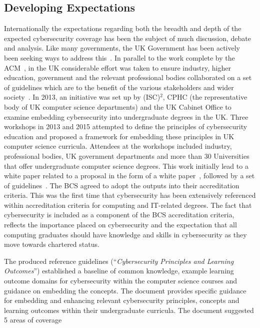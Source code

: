 \documentclass[conference]{IEEEtran}
\begin{document}
\subsection{Developing Expectations}

Internationally the expectations regarding both the breadth and depth of the expected cybersecurity coverage has been the subject of much discussion, debate and analysis. Like many governments, the UK Government has been actively been seeking ways to address this~\cite{UKCabinetOffice2014,ukcyberstrategy:2016}. In parallel to the work complete by the ACM~\cite{ACM2013a}, in the UK considerable effort was taken to ensure industry, higher education, government and the relevant professional bodies collaborated on a set of guidelines which are to the benefit of the various stakeholders and wider society~\cite{Irons2016}. In 2013, an initiative was set up by (ISC)$^2$, CPHC (the representative body of UK computer science departments) and the UK Cabinet Office to examine embedding cybersecurity into undergraduate degrees in the UK. Three workshops in 2013 and 2015 attempted to define the principles of cybersecurity education and proposed a framework for embedding these principles in UK computer science curricula. Attendees at the workshops included industry, professional bodies, UK government departments and more than 30 Universities that offer undergraduate computer science degrees. This work initially lead to a white paper related to a proposal in the form of a white paper~\cite{CPHCISC2014}, followed by a set of guidelines~\cite{CPHCISC2}. The BCS agreed to adopt the outputs into their accreditation criteria. This was the first time that cybersecurity has been extensively referenced within accreditation criteria for computing and IT-related degrees. The fact that cybersecurity is included as a component of the BCS accreditation criteria, reflects the importance placed on cybersecurity and the expectation that all computing graduates should have knowledge and skills in cybersecurity as they move towards chartered status.

The produced reference guidelines (``{\emph{Cybersecurity Principles and Learning Outcomes}}'') \cite{CPHCISC2} established a baseline of common knowledge, example learning outcome domains for cybersecurity within the computer science courses and guidance on embedding the concepts. The document provides specific guidance for embedding and enhancing relevant cybersecurity principles, concepts and learning outcomes within their undergraduate curricula. The document suggested 5 areas of coverage 
\end{document}
